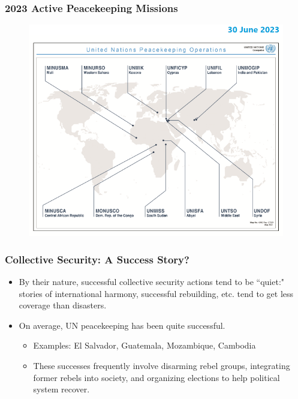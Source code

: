\documentclass{beamer}
\begin{document}
\begin{frame} 
	\frametitle{\LARGE{2023 Active Peacekeeping Missions}}
	\begin{figure}[ht!]
		\centering
		\includegraphics[width=\textwidth,height=\textheight,keepaspectratio]{UNpeacekeeping.png}
	\end{figure}
\end{frame}	

\begin{frame} 
	\frametitle{\LARGE{Collective Security: A Success Story?}}
	\begin{itemize}
		\item By their nature, successful collective security actions tend to be ``quiet:" stories of international harmony, successful rebuilding, etc. tend to get less coverage than disasters. \pause
		\item On average, UN peacekeeping has been quite successful.
		\begin{itemize}
			\item Examples: El Salvador, Guatemala, Mozambique, Cambodia
			\item These successes frequently involve disarming rebel groups, integrating former rebels into society, and organizing elections to help political system recover.
		\end{itemize}
	\end{itemize}
\end{frame}
\end{document}
